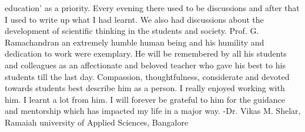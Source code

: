 education’ as a priority. Every evening there used to be discussions and after that I used to write up what I had learnt. We also had discussions about the development of scientific thinking in the students and society.
Prof. G. Ramachandran an extremely humble human being and his humility and dedication to work were exemplary. He will be remembered by all his students and colleagues as an affectionate and beloved teacher who gave his best to his students till the last day. Compassion, thoughtfulness, considerate and devoted towards students best describe him as a person. I really enjoyed working with him. I learnt a lot from him. I will forever be grateful to him for the guidance and mentorship which has impacted my life in a major way.
-Dr. Vikas M. Shelar, Ramaiah university of Applied Sciences, Bangalore




